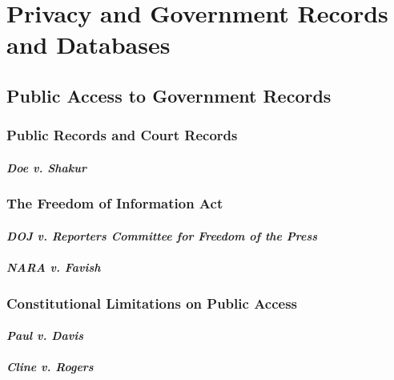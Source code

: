 \section{Privacy and Government Records and Databases}

\subsection{Public Access to Government Records}

\subsubsection{Public Records and Court Records}


\paragraph{\emph{Doe v. Shakur}}


\subsubsection{The Freedom of Information Act}


\paragraph{\emph{DOJ v. Reporters Committee for Freedom of the Press}}


\paragraph{\emph{NARA v. Favish}}


\subsubsection{Constitutional Limitations on Public Access}

\paragraph{\emph{Paul v. Davis}}


\paragraph{\emph{Cline v. Rogers}}

